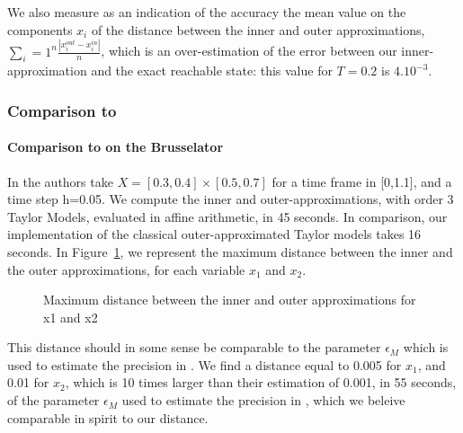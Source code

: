 We also measure as an indication of the accuracy the mean value on the components $x_i$ of the distance between the inner and outer approximations, $\sum_i=1^n \frac{|x_i^{out} - x_i^{in}|}{n}$,
which is an over-estimation of the error between our inner-approximation and the exact reachable state: this value for $T=0.2$ is $4.10^{-3}$.




\subsubsection{Comparison to \cite{underapprox16}}
\paragraph{Comparison to \cite{underapprox16} on the Brusselator}
In \cite{underapprox16} the authors take $X=[0.3, 0.4] \times [0.5, 0.7]$ for a time frame in [0,1.1], and a time step h=0.05. 
We compute the inner and outer-approximations, with order 3 Taylor Models, evaluated in affine arithmetic, in 45 seconds.
In comparison, our implementation of the classical outer-approximated Taylor models takes 16 seconds. 
In Figure~\ref{fig:bruss_cav16_dist}, we represent the maximum distance between the inner 
and the outer approximations, for each variable $x_1$ and $x_2$.
\begin{figure}[htbp]
\begin{center}
\end{center}
\caption{Maximum distance between the inner and outer approximations for x1 and x2 \label{fig:bruss_cav16_dist}}
\end{figure}
This distance should in some sense be comparable to the parameter  $\epsilon_M$ which is used to estimate the precision in \cite{underapprox16}.
We find a distance equal to 0.005 for $x_1$, and 0.01 for $x_2$, which is 10 times larger than their estimation of 0.001, in 55 seconds, 
of the parameter  $\epsilon_M$ used to estimate the precision in \cite{underapprox16}, which we beleive comparable in spirit to our distance. 

